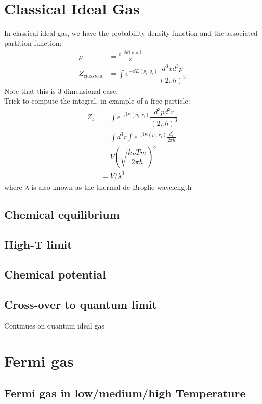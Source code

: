 \documentclass[10pt,a4paper]{article}
\begin{document}
\section{Classical Ideal Gas}
    In classical ideal gas, we have the probability density function and the associated partition function:
    \begin{align*}
        \rho &= \frac{e^{-\beta E({p_i,q_i})}}{Z}\\
        Z_{classical} &= \int e^{-\beta E({p_i,q_i})} \dfrac{d^3x d^3p}{(2\pi\hbar)^3}
    \end{align*}
    Note that this is 3-dimensional case.\\
    Trick to compute the integral, in example of a free particle:
    \begin{align*}
        Z_1 &= \int e^{-\beta E({p_i,r_i})} \dfrac{d^3p d^3r}{(2\pi\hbar)^3}\\
            &= \int d^3r \int e^{-\beta E({p_i,r_i})} \frac{d^p_x}{2\pi\hbar}\\
            &= V(\sqrt{\dfrac{k_BTm}{2\pi\hbar}})^3\\
            &= V/\lambda^3
    \end{align*}
    where $\lambda$ is also known as the thermal de Broglie wavelength 
    

\subsection{Chemical equilibrium}
\subsection{High-T limit}
\subsection{Chemical potential}

\subsection{Cross-over to quantum limit}
Continues on quantum ideal gas
\section{Fermi gas}
\subsection{Fermi gas in low/medium/high Temperature}
\end{document}

